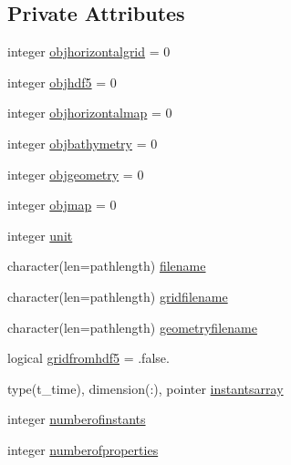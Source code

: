 \subsection*{Private Attributes}
\begin{DoxyCompactItemize}
\item 
integer \mbox{\hyperlink{structmoduleinterpolategrids_1_1t__grid_ac2cfdda85151eecb2f4e82bfba52cb76}{objhorizontalgrid}} = 0
\item 
integer \mbox{\hyperlink{structmoduleinterpolategrids_1_1t__grid_acf6ba91709c843ea5ddc684ed0fbf34b}{objhdf5}} = 0
\item 
integer \mbox{\hyperlink{structmoduleinterpolategrids_1_1t__grid_aedd1f412ac482b08bc48f0742bd5bd31}{objhorizontalmap}} = 0
\item 
integer \mbox{\hyperlink{structmoduleinterpolategrids_1_1t__grid_abc5c48c8cfd7fd852f1808ab2ebf9a97}{objbathymetry}} = 0
\item 
integer \mbox{\hyperlink{structmoduleinterpolategrids_1_1t__grid_a743830e648de51e7a4698223695b2a29}{objgeometry}} = 0
\item 
integer \mbox{\hyperlink{structmoduleinterpolategrids_1_1t__grid_a2fec1036628da62d7ec46734d244ad60}{objmap}} = 0
\item 
integer \mbox{\hyperlink{structmoduleinterpolategrids_1_1t__grid_a62793b7166415dde42a4891fbdd1aa03}{unit}}
\item 
character(len=pathlength) \mbox{\hyperlink{structmoduleinterpolategrids_1_1t__grid_ae23b608e43d1aaee1ee51f66698dc510}{filename}}
\item 
character(len=pathlength) \mbox{\hyperlink{structmoduleinterpolategrids_1_1t__grid_ab1bfc10c3010f72707ff4a746b4eaf67}{gridfilename}}
\item 
character(len=pathlength) \mbox{\hyperlink{structmoduleinterpolategrids_1_1t__grid_a35ab22cc64812ca55c90ed7309815ebb}{geometryfilename}}
\item 
logical \mbox{\hyperlink{structmoduleinterpolategrids_1_1t__grid_aaf85ae75a9343a47a6d996e370e0cbeb}{gridfromhdf5}} = .false.
\item 
type(t\+\_\+time), dimension(\+:), pointer \mbox{\hyperlink{structmoduleinterpolategrids_1_1t__grid_a8f3c093955e3dda5d7553b27bc1d7ef4}{instantsarray}}
\item 
integer \mbox{\hyperlink{structmoduleinterpolategrids_1_1t__grid_aabf64cd067a53c3d3cdbbd29c4cb2de6}{numberofinstants}}
\item 
integer \mbox{\hyperlink{structmoduleinterpolategrids_1_1t__grid_a2837b85ceff8ea5ae403b7613f49ee34}{numberofproperties}}

\end{DoxyCompactItemize}

